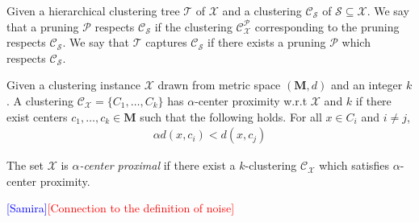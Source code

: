 \documentclass[anon,12pt]{colt2016} %
\newcommand{\mc}{\mathcal}
\newcommand{\mb}{\mathbf}
\newcommand{\samira}{\textcolor{blue}{[Samira]}\xspace}
\begin{document}
\begin{definition}[$\mc T$ captures $\mc C_{\mc S}$]Given a hierarchical clustering tree $\mc T$ of $\mc X$ and a clustering $\mc C_{\mc S}$ of $\mc S \subseteq \mc X$. We say that a pruning $\mc P$ respects $\mc C_{\mc S}$ if the clustering $\mc C_{\mc X}^{\mc P}$ corresponding to the pruning respects $\mc C_{\mc S}$. We say that $\mc T$ captures $\mc C_{\mc S}$ if there exists a pruning $\mc P$ which respects $\mc C_{\mc S}$.
\end{definition}

\begin{definition}
\label{defn:alphacp}
Given a clustering instance $\mc X$ drawn from metric space $(\mb M, d)$ and an integer $k$. A clustering $\mc C_{\mc X} = \{C_1, \ldots, C_k\}$ has $\alpha$-center proximity w.r.t $\mc X$ and $k$ if there exist centers $c_1, \ldots, c_k \in \mb M$  such that the following holds. For all $x \in C_i$ and $i\neq j$, 
\vspace{-0.05in}\begin{align*}
\alpha d(x, c_i) < d(x, c_j)
\end{align*}

\end{definition}

\noindent The set $\mc X$ is {\it $\alpha$-center proximal} if there exist a $k$-clustering $\mc C_{\mc X}$  which satisfies $\alpha$-center proximity. 

\samira\textcolor{red}{[Connection to the definition of noise]}
\end{document}
